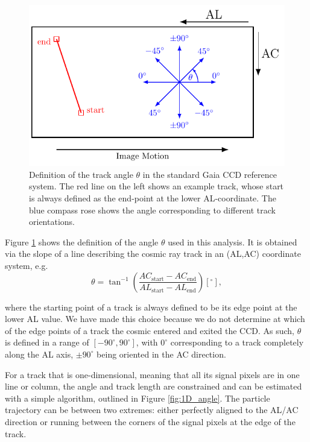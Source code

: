\documentclass[a4paper, 11pt]{article}
\begin{document}
\begin{figure}
  \centering
  \includegraphics{images/postprocessing/theta_sketch}
  \caption{Definition of the track angle $\theta$ in the standard Gaia CCD reference system. The red line on the left shows an example track, whose start is always defined as the end-point at the lower AL-coordinate. The blue compass rose shows the angle corresponding to different track orientations.}
  \label{fig:theta_sketch}
\end{figure}
Figure \ref{fig:theta_sketch} shows the definition of the angle $\theta$ used in this analysis. It is obtained via the slope of a line describing the cosmic ray track in an (AL,AC) coordinate system, e.g. 
\begin{equation}
  \theta = \tan^{-1} \left( \frac{AC_\mathrm{start} - AC_\mathrm{end}}{AL_\mathrm{start} - AL_\mathrm{end}} \right) [^{\circ}],
  \label{eq:theta_def}
\end{equation}

where the starting point of a track is always defined to be its edge point at the lower AL value. We have made this choice because we do not determine at which of the edge points of a track the cosmic entered and exited the CCD. As such, $\theta$ is defined in a range of $\left[ -90^{\circ}, 90^{\circ} \right]$, with $0^{\circ}$ corresponding to a track completely along the AL axis, $\pm 90 ^{\circ}$ being oriented in the AC direction.

For a track that is one-dimensional, meaning that all its signal pixels are in one line or column, the angle and track length are constrained and can be estimated with a simple algorithm, outlined in Figure \ref{fig:1D_angle}. The particle trajectory can be between two extremes: either perfectly aligned to the AL/AC direction or running between the corners of the signal pixels at the edge of the track.
\end{document}
